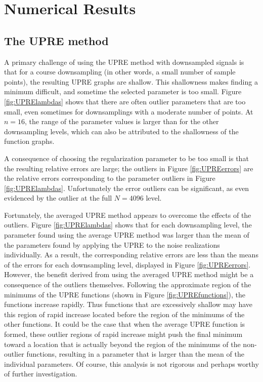 \documentclass[12pt]{article}
\begin{document}
\section{Numerical Results} \label{Numerical results}

\subsection{The UPRE method} \label{The UPRE method}
A primary challenge of using the UPRE method with downsampled signals is that for a course downsampling (in other words, a small number of sample points), the resulting UPRE graphs are shallow. This shallowness makes finding a minimum difficult, and sometime the selected parameter is too small. Figure \ref{fig:UPRElambdas} shows that there are often outlier parameters that are too small, even sometimes for downsamplings with a moderate number of points. At $n = 16$, the range of the parameter values is larger than for the other downsampling levels, which can also be attributed to the shallowness of the function graphs. \par 
A consequence of choosing the regularization parameter to be too small is that the resulting relative errors are large; the outliers in Figure \ref{fig:UPREerrors} are the relative errors corresponding to the parameter outliers in Figure \ref{fig:UPRElambdas}. Unfortunately the error outliers can be significant, as even evidenced by the outlier at the full $N = 4096$ level. \par 
Fortunately, the averaged UPRE method appears to overcome the effects of the outliers. Figure \ref{fig:UPRElambdas} shows that for each downsampling level, the parameter found using the average UPRE method was larger than the mean of the parameters found by applying the UPRE to the noise realizations individually. As a result, the corresponding relative errors are less than the means of the errors for each downsampling level, displayed in Figure \ref{fig:UPREerrors}. However, the benefit derived from using the averaged UPRE method might be a consequence of the outliers themselves. Following the approximate region of the minimums of the UPRE functions (shown in Figure \ref{fig:UPREfunctions}), the functions increase rapidly. Thus functions that are excessively shallow may have this region of rapid increase located before the region of the minimums of the other functions. It could be the case that when the average UPRE function is formed, these outlier regions of rapid increase might push the final minimum toward a location that is actually beyond the region of the minimums of the non-outlier functions, resulting in a parameter that is larger than the mean of the individual parameters. Of course, this analysis is not rigorous and perhaps worthy of further investigation. 
\end{document}
